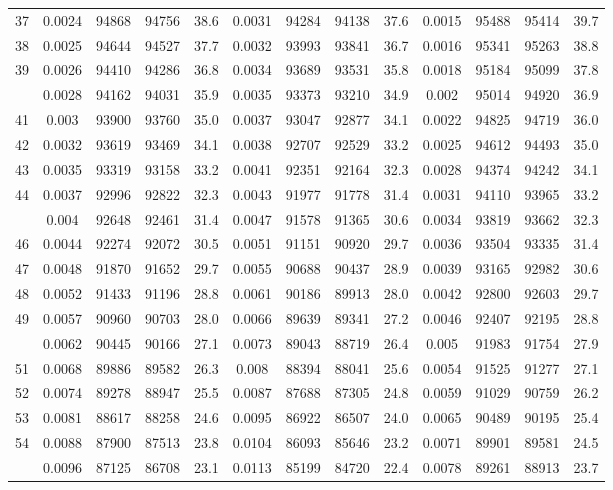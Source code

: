 \documentclass[
  14pt,
]{article}
\begin{document}
\begin{longtable}[t]{lcccccccccccc}
37 & 0.0024 & 94868 & 94756 & 38.6 & 0.0031 & 94284 & 94138 & 37.6 & 0.0015 & 95488 & 95414 & 39.7\\
38 & 0.0025 & 94644 & 94527 & 37.7 & 0.0032 & 93993 & 93841 & 36.7 & 0.0016 & 95341 & 95263 & 38.8\\
39 & 0.0026 & 94410 & 94286 & 36.8 & 0.0034 & 93689 & 93531 & 35.8 & 0.0018 & 95184 & 95099 & 37.8\\
\addlinespace
40 & 0.0028 & 94162 & 94031 & 35.9 & 0.0035 & 93373 & 93210 & 34.9 & 0.002 & 95014 & 94920 & 36.9\\
41 & 0.003 & 93900 & 93760 & 35.0 & 0.0037 & 93047 & 92877 & 34.1 & 0.0022 & 94825 & 94719 & 36.0\\
42 & 0.0032 & 93619 & 93469 & 34.1 & 0.0038 & 92707 & 92529 & 33.2 & 0.0025 & 94612 & 94493 & 35.0\\
43 & 0.0035 & 93319 & 93158 & 33.2 & 0.0041 & 92351 & 92164 & 32.3 & 0.0028 & 94374 & 94242 & 34.1\\
44 & 0.0037 & 92996 & 92822 & 32.3 & 0.0043 & 91977 & 91778 & 31.4 & 0.0031 & 94110 & 93965 & 33.2\\
\addlinespace
45 & 0.004 & 92648 & 92461 & 31.4 & 0.0047 & 91578 & 91365 & 30.6 & 0.0034 & 93819 & 93662 & 32.3\\
46 & 0.0044 & 92274 & 92072 & 30.5 & 0.0051 & 91151 & 90920 & 29.7 & 0.0036 & 93504 & 93335 & 31.4\\
47 & 0.0048 & 91870 & 91652 & 29.7 & 0.0055 & 90688 & 90437 & 28.9 & 0.0039 & 93165 & 92982 & 30.6\\
48 & 0.0052 & 91433 & 91196 & 28.8 & 0.0061 & 90186 & 89913 & 28.0 & 0.0042 & 92800 & 92603 & 29.7\\
49 & 0.0057 & 90960 & 90703 & 28.0 & 0.0066 & 89639 & 89341 & 27.2 & 0.0046 & 92407 & 92195 & 28.8\\
\addlinespace
50 & 0.0062 & 90445 & 90166 & 27.1 & 0.0073 & 89043 & 88719 & 26.4 & 0.005 & 91983 & 91754 & 27.9\\
51 & 0.0068 & 89886 & 89582 & 26.3 & 0.008 & 88394 & 88041 & 25.6 & 0.0054 & 91525 & 91277 & 27.1\\
52 & 0.0074 & 89278 & 88947 & 25.5 & 0.0087 & 87688 & 87305 & 24.8 & 0.0059 & 91029 & 90759 & 26.2\\
53 & 0.0081 & 88617 & 88258 & 24.6 & 0.0095 & 86922 & 86507 & 24.0 & 0.0065 & 90489 & 90195 & 25.4\\
54 & 0.0088 & 87900 & 87513 & 23.8 & 0.0104 & 86093 & 85646 & 23.2 & 0.0071 & 89901 & 89581 & 24.5\\
\addlinespace
55 & 0.0096 & 87125 & 86708 & 23.1 & 0.0113 & 85199 & 84720 & 22.4 & 0.0078 & 89261 & 88913 & 23.7\\

\end{longtable}
\end{document}
